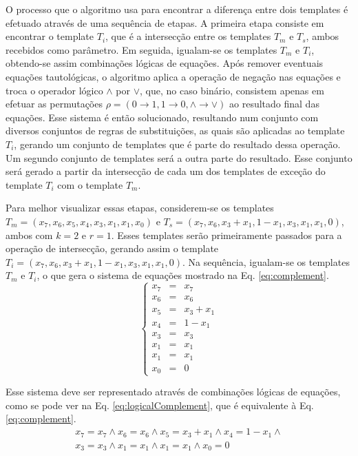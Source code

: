 O processo que o algoritmo usa para encontrar a diferença entre dois templates é efetuado através de uma sequência de etapas. A primeira etapa consiste em encontrar o template $T_i$, que é a intersecção entre os templates $T_m$ e $T_s$, ambos recebidos como parâmetro. Em seguida, igualam-se os templates $T_m$ e $T_i$, obtendo-se assim combinações lógicas de equações. Após remover eventuais equações tautológicas, o algoritmo aplica a operação de negação nas equações e troca o operador lógico $\wedge$ por $\vee$, que, no caso binário, consistem apenas em efetuar as permutações $\rho = (0 \rightarrow 1, 1 \rightarrow 0, \wedge \rightarrow \vee)$ ao resultado final das equações. Esse sistema é então solucionado, resultando num conjunto com diversos conjuntos de regras de substituições, as quais são aplicadas ao template $T_i$, gerando um conjunto de templates que é parte do resultado dessa operação. Um segundo conjunto de templates será a outra parte do resultado. Esse conjunto será gerado a partir da intersecção de cada um dos templates de exceção do template $T_i$ com o template $T_m$.

Para melhor visualizar essas etapas, considerem-se os templates $T_m = (x_7, x_6, x_5, x_4, x_3, x_1, x_1, x_0)$ e $T_s = (x_7, x_6, x_3 + x_1, 1 - x_1, x_3, x_1, x_1, 0)$, ambos com $k=2$ e $r=1$. Esses templates serão primeiramente passados para a operação de intersecção, gerando assim o template $T_i = (x_7, x_6, x_3 + x_1, 1 - x_1, x_3, x_1, x_1, 0)$. Na sequência, igualam-se os templates $T_m$ e $T_i$, o que gera o sistema de equações mostrado na Eq. \eqref{eq:complement}.
\begin{equation}
\left\{\begin{matrix}
x_7 & = & x_7	\\ 
x_6 & = & x_6	\\ 
x_5 & = & x_3 + x_1	\\ 
x_4 & = & 1 - x_1 \\ 
x_3 & = & x_3	\\ 
x_1 & = & x_1	\\ 
x_1 & = & x_1	\\ 
x_0 & = & 0
\end{matrix}\right.
\label{eq:complement}
\end{equation}

Esse sistema deve ser representado através de combinações lógicas de equações, como se pode ver na Eq. \eqref{eq:logicalComplement}, que é equivalente à Eq. \eqref{eq:complement}.
\begin{equation}
\begin{split}
x_7 = x_7	\wedge  
x_6 = x_6	\wedge  
x_5 = x_3 + x_1	\wedge  
x_4 =   1 - x_1 \wedge  \\
x_3 = x_3	\wedge  
x_1 = x_1	\wedge  
x_1 = x_1	\wedge  
x_0 = 0
\end{split}
\label{eq:logicalComplement}
\end{equation}

